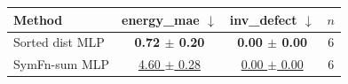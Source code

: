 \begin{tabular}{lccc}
\toprule
Method & energy\_mae $\downarrow$ & inv\_defect $\downarrow$ & $n$ \\
\midrule
Sorted dist MLP & \textbf{0.72 $\pm$ 0.20} & \textbf{0.00 $\pm$ 0.00} & 6 \\
SymFn-sum MLP & \underline{4.60 $\pm$ 0.28} & \underline{0.00 $\pm$ 0.00} & 6 \\
\bottomrule
\end{tabular}
